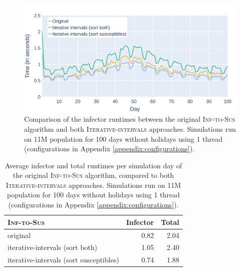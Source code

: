\begin{figure}
    \centering
    \includegraphics[width=\linewidth]{4 - Sampling/fig/inf_to_sus/its_infectors_ii.png}
    \caption{Comparison of the infector runtimes between the original \textsc{Inf-to-Sus} algorithm and both \textsc{Iterative-intervals} approaches. Simulations run on 11M population for 100 days without holidays using 1 thread (configurations in Appendix \ref{appendix:configurations}).}
    \label{fig:its_infector_ii}
\end{figure}

\begin{table}
    \centering
    \begin{tabular}{@{}lrr@{}}
        \toprule
        \textsc{Inf-to-Sus}                     & Infector & Total \\ \midrule
        original                                & 0.82     & 2.04  \\
        iterative-intervals (sort both)         & 1.05     & 2.40  \\
        iterative-intervals (sort susceptibles) & 0.74     & 1.88  \\ \bottomrule
    \end{tabular}
    \caption{Average infector and total runtimes per simulation day of the original \textsc{Inf-to-Sus} algorithm, compared to both \textsc{Iterative-intervals} approaches. Simulations run on 11M population for 100 days without holidays using 1 thread (configurations in Appendix \ref{appendix:configurations}).}
    \label{tab:runtimes_its_ii}
\end{table}

